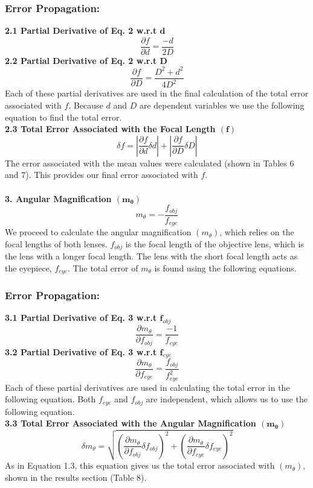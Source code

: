 \documentclass[12pt]{article}
\begin{document}
\subsubsection*{Error Propagation:}
    \noindent\textbf{2.1 Partial Derivative of Eq. 2 w.r.t $\bm d$}\[\frac{\partial f}{\partial d}=\dfrac{-d}{2D}\]
    \textbf{2.2 Partial Derivative of Eq. 2 w.r.t $\bm D$} \[\frac{\partial f}{\partial D}=\dfrac{D^2+d^2}{4D^2}\]
    Each of these partial derivatives are used in the final calculation of the total error associated with $f.$ Because $d$ and $D$ are dependent variables we use the following equation to find the total error.\\
    \textbf{2.3 Total Error Associated with the Focal Length $\bm{(f)}$}\[\delta f =\left|\frac{\partial f}{\partial d}\delta d\right|+\left|\frac{\partial f}{\partial D}\delta D\right|\]
    The error associated with the mean values were calculated (shown in Tables 6 and 7). This provides our final error associated with $f$.\\
\\\textbf{3. Angular Magnification $\bm{(m_\theta)}$}\[m_\theta=-\frac{f_{obj}}{f_{eye}}\]
    We proceed to calculate the angular magnification $(m_\theta)$, which relies on the focal lengths of both lenses. $f_{obj}$ is the focal length of the objective lens, which is the lens with a longer focal length. The lens with the short focal length acts as the eyepiece, $f_{eye}.$ The total error of $m_\theta$ is found using the following equations.
\subsubsection*{Error Propagation:}
    \noindent\textbf{3.1 Partial Derivative of Eq. 3 w.r.t $\bm f_{obj}$}\[\frac{\partial m_\theta}{\partial f_{obj}}=\dfrac{-1}{f_{eye}}\]
    \textbf{3.2 Partial Derivative of Eq. 3 w.r.t $\bm f_{eye}$} \[\frac{\partial m_\theta}{\partial f_{eye}}=\dfrac{f_{obj}}{f_{eye}^2}\]
    Each of these partial derivatives are used in calculating the total error in the following equation. Both $f_{eye}$ and $f_{obj}$ are independent, which allows us to use the following equation.\\
    \textbf{3.3 Total Error Associated with the Angular Magnification $\bm{({m_\theta})}$}\[\delta m_\theta =\sqrt{\left(\frac{\partial m_\theta}{\partial f_{obj}}\delta f_{obj}\right)^2+\left(\frac{\partial m_\theta}{\partial f_{eye}}\delta f_{eye}\right)^2}\]
    As in Equation 1.3, this equation gives us the total error associated with $(m_\theta)$, shown in the results section (Table 8).
\newpage
\end{document}
